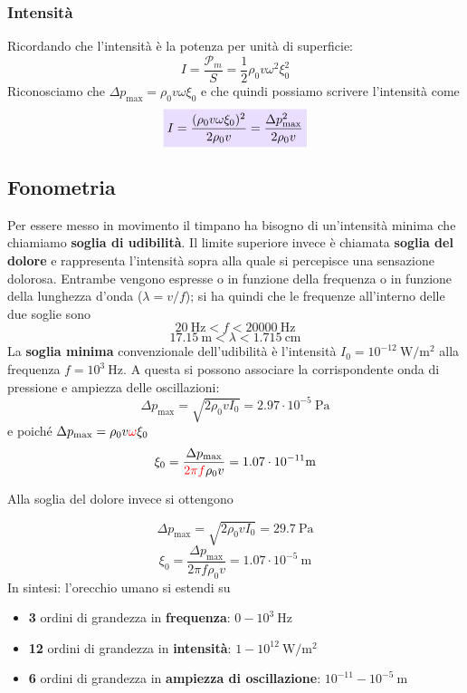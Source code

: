 \documentclass[x11names]{article}
\newcommand{\viola}[1]{\colorbox{myred}{$\displaystyle #1$}}
\begin{document}
	\subsubsection{Intensità}
	Ricordando che l'intensità è la potenza per unità di superficie:
	\[ 
	I = \frac{\mathcal{P}_m }{S} =   \frac{1}{2} \rho_0 v \omega ^2 \xi_0^2
	\]
	Riconosciamo che \(\Delta p_{\text{max}} = \rho_0 v \omega  \xi_0\) e che quindi possiamo scrivere l'intensità come
	\begin{equation}\label{intensita_fono}
		\viola{I = \frac{(\rho_0 v \omega  \xi_0)^2}{2\rho_0 v} = \frac{\Delta p_{\text{max}}^2}{2\rho_0 v}}
	\end{equation}
	
	
	\subsection{Fonometria}
	Per essere messo in movimento il timpano ha bisogno di un'intensità minima che chiamiamo \textbf{soglia di udibilità}. Il limite superiore invece è chiamata \textbf{soglia del dolore} e rappresenta l'intensità sopra alla quale si percepisce una sensazione dolorosa. Entrambe vengono espresse o in funzione della frequenza o in funzione della lunghezza d'onda (\(\lambda=v/f\)); si ha quindi che le frequenze all'interno delle due soglie sono
	\[ 
		\SI{20}{\hertz} < f < \SI{20000}{\hertz}
	\]
	\[ 
		\SI{17.15}{\m} < \lambda < \SI{1.715}{\cm}
	\]
	La\textbf{ soglia minima} convenzionale dell'udibilità è l'intensità \(I_0 = 10^{-12}\SI{}{\watt/\m^2}\) alla frequenza  \(f = 10^3\SI{}{\hertz}\). A questa si possono associare la corrispondente onda di pressione e ampiezza delle oscillazioni:
	\[ 
		\Delta p_{\text{max}} = \sqrt{2\rho_0 v I_0} = 2.97 \cdot 10^{-5} \SI{}{\pascal}
	\]
	e poiché  \(\Delta p_{\text{max}} = \rho_0 v \textcolor{red}{\omega } \xi_0\)
	\[ 
		\xi_0 = \frac{\Delta p_{\text{max}}}{\textcolor{red}{2\pi f}\rho_0 v} = 1.07 \cdot 10^{-11}\SI{}{\m}
	\]
	
	Alla soglia del dolore invece si ottengono 
	
	\[ 
	\Delta p_{\text{max}} = \sqrt{2\rho_0 v I_0} = 29.7 \SI{}{\pascal}
	\]
	\[ 
	\xi_0 = \frac{\Delta p_{\text{max}}}{2\pi f\rho_0 v} = 1.07 \cdot 10^{-5}\SI{}{\m}
	\]
	In sintesi: l'orecchio umano si estendi su
	\begin{itemize}
		\item \textbf{3} ordini di grandezza in \textbf{frequenza}: \(0 - 10^3 \SI{}{\hertz}\)
		\item \textbf{12} ordini di grandezza in \textbf{intensità}: \(1 - 10^12 \SI{}{\watt/\m^2}\)
		\item \textbf{6} ordini di grandezza in \textbf{ampiezza di oscillazione}: \(10^{-11} - 10^{-5} \SI{}{\m}\)
	\end{itemize}
	
\end{document}
